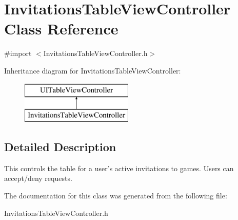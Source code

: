 \hypertarget{interface_invitations_table_view_controller}{\section{Invitations\+Table\+View\+Controller Class Reference}
\label{interface_invitations_table_view_controller}
}


{\ttfamily \#import $<$Invitations\+Table\+View\+Controller.\+h$>$}

Inheritance diagram for Invitations\+Table\+View\+Controller\+:\begin{figure}[H]
\begin{center}
\leavevmode
\includegraphics[height=2.000000cm]{interface_invitations_table_view_controller}
\end{center}
\end{figure}


\subsection{Detailed Description}
This controls the table for a user's active invitations to games. Users can accept/deny requests. 

The documentation for this class was generated from the following file\+:\begin{DoxyCompactItemize}
\item 
Invitations\+Table\+View\+Controller.\+h\end{DoxyCompactItemize}
